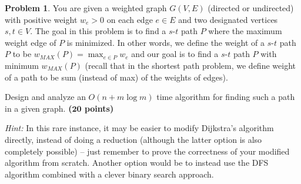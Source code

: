 \documentclass{article}
\theoremstyle{definition}
\newtheorem{problem}{Problem}
\newcommand{\grade}[1]{\hfill{\textbf{($\mathbf{#1}$ points)}}}
\begin{document}
\begin{problem}\label{prob}
	You are given a weighted graph $G(V,E)$ (directed or undirected) with positive weight $w_e > 0$ on each edge $e \in E$ and two designated vertices $s,t \in V$. The goal in this problem is to find a $s$-$t$ path 
	$P$ where the maximum weight edge of $P$ is minimized. In other words, we define the weight of a $s$-$t$ path $P$ to be $w_{MAX}(P) = \max_{e \in P} w_e$ and our goal is to find a $s$-$t$ path $P$ with minimum $w_{MAX}(P)$ (recall that in the shortest
	path problem, we define weight of a path to be sum (instead of max) of the weights of edges). 

	Design and analyze an $O(n+m\log{m})$ time algorithm for finding such a path in a given graph. 	
	\grade{20}
	
	
	\emph{Hint:} In this rare instance, it may be easier to modify Dijkstra's algorithm directly, instead of doing a reduction (although the latter option is also completely possible) -- just remember to prove the correctness
	of your modified algorithm from scratch. Another option would be to instead use the DFS algorithm  combined with a clever binary search approach.  
	
\end{problem}
\end{document}
